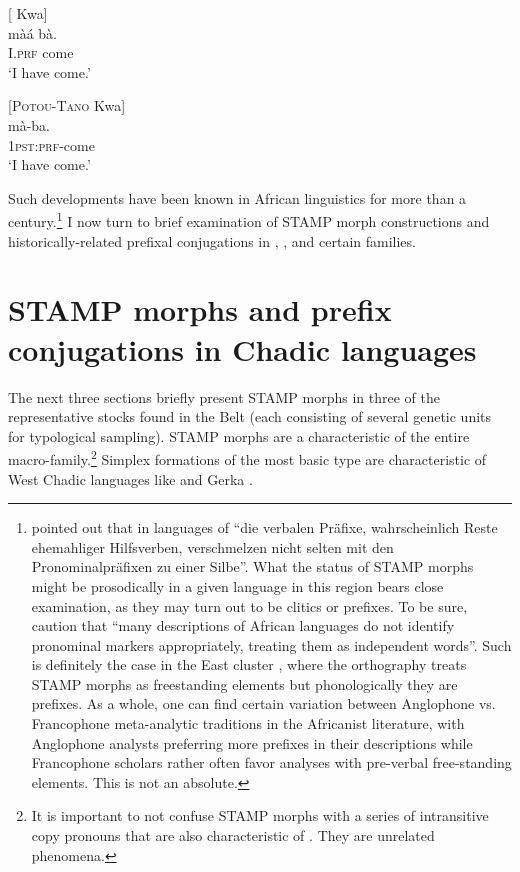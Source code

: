 \documentclass[output=paper]{langsci/langscibook}
\begin{document}
\ea\label{ex:anderson:39}
  \citep[Nchumuru 5]{Price1975}   [ Kwa]\\
\gll màá  bà.\\
I.\textsc{prf}  come\\
\glt `I have come.'
\z

\ea\label{ex:anderson:40}
 \citep[Nuchumuru 4]{Cleal1973}      [\textsc{Potou-Tano} Kwa]\\
\gll mà-ba.\\
\textsc{1pst}:\textsc{prf}-come\\
\glt `I have come.'
\z

\largerpage
Such developments have been known in African linguistics for more than a century.\footnote{\citet[211]{Seidel1898} pointed out that in  languages of  ``die verbalen Präfixe, wahrscheinlich Reste ehemahliger Hilfsverben, verschmelzen nicht selten mit den Pronominalpräfixen zu einer Silbe''. What the status of STAMP morphs might be prosodically in a given language in this region bears close examination, as they may turn out to be clitics or prefixes. To be sure, \citet[93]{CreisselsEtAl2008} caution that ``many descriptions of African languages do not identify pronominal markers appropriately, treating them as independent words''. Such is definitely the case in the East   cluster \citep{Jones1998}, where the orthography treats STAMP morphs as freestanding elements but phonologically they are prefixes. As a whole, one can find certain variation between Anglophone vs. Francophone meta-analytic traditions in the Africanist literature, with Anglophone analysts preferring more prefixes in their descriptions while Francophone scholars rather often favor analyses with pre-verbal free-standing elements. This is not an absolute.} 
I now turn to brief examination of STAMP morph constructions and historically-related prefixal conjugations in , , and certain  families.

\section{STAMP morphs and prefix conjugations in {Chadic} languages}\label{sec:Anderson:7}
 
The next three sections briefly present STAMP morphs in three of the representative stocks found in the  Belt (each consisting of several genetic units for typological sampling). STAMP morphs are a characteristic of the entire  macro-family.\footnote{It is important to not confuse STAMP morphs with a series of intransitive copy pronouns that are also characteristic of  \citep{Frajzyngier1977, Burquest1986}. They are unrelated phenomena.} Simplex formations of the most basic type  are characteristic of West Chadic languages like   and Gerka .
\end{document}
